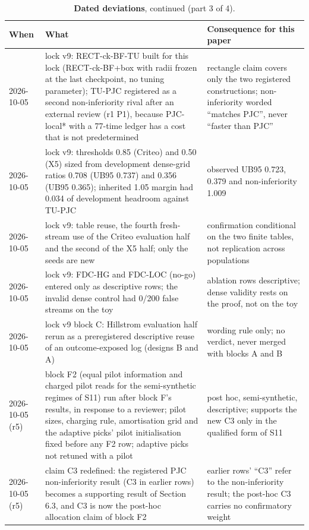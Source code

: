 \documentclass[sigconf,anonymous,review]{acmart}
\begin{document}
\begin{table}[p]
\addtocounter{table}{-1}
\caption{\textbf{Dated deviations}, continued (part 3 of 4).}
\small
\begin{tabular}{@{}l>{\raggedright\arraybackslash}p{6.6cm}>{\raggedright\arraybackslash}p{7.6cm}@{}}
\toprule
When & What & Consequence for this paper \\
\midrule
2026-10-05 & lock v9: RECT-ck-BF-TU built for this lock (RECT-ck-BF+box with radii frozen at the last checkpoint, no tuning parameter); TU-PJC registered as a second non-inferiority rival after an external review (r1 P1), because PJC-local* with a 77-time ledger has a cost that is not predetermined & rectangle claim covers only the two registered constructions; non-inferiority worded ``matches PJC'', never ``faster than PJC'' \\
2026-10-05 & lock v9: thresholds 0.85 (Criteo) and 0.50 (X5) sized from development dense-grid ratios 0.708 (UB95 0.737) and 0.356 (UB95 0.365); inherited 1.05 margin had 0.034 of development headroom against TU-PJC & observed UB95 0.723, 0.379 and non-inferiority 1.009 \\
2026-10-05 & lock v9: table reuse, the fourth fresh-stream use of the Criteo evaluation half and the second of the X5 half; only the seeds are new & confirmation conditional on the two finite tables, not replication across populations \\
2026-10-05 & lock v9: FDC-HG and FDC-LOC (no-go) entered only as descriptive rows; the invalid dense control had 0/200 false streams on the toy & ablation rows descriptive; dense validity rests on the proof, not on the toy \\
2026-10-05 & lock v9 block C: Hillstrom evaluation half rerun as a preregistered descriptive reuse of an outcome-exposed log (designs B and A) & wording rule only; no verdict, never merged with blocks A and B \\
2026-10-05 (r5) & block F2 (equal pilot information and charged pilot reads for the semi-synthetic regimes of S11) run after block F's results, in response to a reviewer; pilot sizes, charging rule, amortisation grid and the adaptive picks' pilot initialisation fixed before any F2 row; adaptive picks not retuned with a pilot & post hoc, semi-synthetic, descriptive; supports the new C3 only in the qualified form of S11 \\
2026-10-05 (r5) & claim C3 redefined: the registered PJC non-inferiority result (C3 in earlier rows) becomes a supporting result of Section 6.3, and C3 is now the post-hoc allocation claim of block F2 & earlier rows' ``C3'' refer to the non-inferiority result; the post-hoc C3 carries no confirmatory weight \\

\end{tabular}
\end{table}
\end{document}

